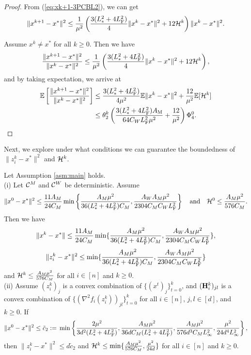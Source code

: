 \documentclass[11pt]{article}
\begin{document}
\begin{proof}
		
		From (\ref{eq:xk+1-3PCBL2}), we can get 
		$$
		\|x^{k+1} - x^*\|^2 \leq \frac{1}{\mu^2} \left(  \frac{3(L_{*}^2+4L_{\rm F}^2)}{4} \|x^k-x^*\|^2 + 12 {\cal H}^k  \right) \|x^k-x^*\|^2. 
		$$
		
		Assume $x^k\neq x^*$ for all $k\geq 0$. Then we have 
		$$
		\frac{\|x^{k+1}-x^*\|^2}{\|x^k-x^*\|^2} \leq \frac{1}{\mu^2} \left(  \frac{3(L_{*}^2+4L_{\rm F}^2)}{4} \|x^k-x^*\|^2 + 12 {\cal H}^k  \right), 
		$$
		and by taking expectation, we arrive at  
		\begin{align*}
			\mathbb{E} \left[   \frac{\|x^{k+1}-x^*\|^2}{\|x^k-x^*\|^2} \right] & \leq \frac{3(L_{*}^2+4L_{\rm F}^2)}{4\mu^2} \mathbb{E}\|x^k-x^*\|^2 + \frac{12}{\mu^2} \mathbb{E}[{\cal H}^k] \\ 
			& \leq \theta_2^k \left(  \frac{3(L_{*}^2+4L_{\rm F}^2)A_{\rm M}}{64C_WL_{\rm F}^2\mu^2} + \frac{12}{\mu^2}  \right) \Phi_4^0. 
		\end{align*}
		
	\end{proof}
	
	
	Next, we explore under what conditions we can guarantee the boundedness of $\|z_i^k-x^*\|^2$ and ${\cal H}^k$. 
	
	\begin{theorem}\label{th:nbor-3PCBL2}
		Let Assumption \ref{asm:main} holds. \\ 
		(i) Let ${\mathcal{C}}^M$ and ${\mathcal{C}}^W$ be deterministic. Assume $$\|x^0 - x^*\|^2 \leq \frac{11A_M}{24C_M}\min\left\{  \frac{A_M \mu^2}{36(L_{*}^2+4L_{\rm F}^2)C_M}, \frac{A_WA_M \mu^2}{2304C_MC_WL_{\rm F}^2}  \right\} \quad\text{and}\quad {\cal H}^0 \leq \frac{A_M \mu^2}{576C_M}.$$ Then we have $$\|x^k-x^*\| \leq \frac{11A_M}{24C_M} \min\{  \frac{A_M \mu^2}{36(L_{*}^2+4L_{\rm F}^2)C_M}, \frac{A_WA_M \mu^2}{2304C_MC_WL_{\rm F}^2}  \},$$ $$\|z_i^k - x^*\|^2 \leq \min\{  \frac{A_M \mu^2}{36(L_{*}^2+4L_{\rm F}^2)C_M}, \frac{A_WA_M \mu^2}{2304C_MC_WL_{\rm F}^2}  \}$$ and ${\cal H}^k \leq  \frac{A_M \mu^2}{576C_M}$ for all $i\in [n]$ and $k\geq 0$. \\ 
		
		(ii) Assume $(z_i^k)_j$ is a convex combination of $\{(x^t)_j\}_{t=0}^k$, and $(\mathbf{H}_i^k)_{jl}$ is a convex combination of $\{  (\nabla^2 f_i(z_i^k))_{jl}  \}_{t=0}^k$ for all $i\in [n]$, $j,l \in [d]$, and $k\geq 0$. If $$\|x^0-x^*\|^2 \leq {\tilde c}_2 \; { := }\; \min\left\{ \frac{2\mu^2}{3d^2 (L_{*}^2+4L_{\rm F}^2)}, \frac{A_M \mu^2}{36dC_M(L_{*}^2+4L_{\rm F}^2)}, \frac{A_M\mu^2}{576d^3C_ML_{\infty}^2}, \frac{\mu^2}{24d^4L_{\infty}^2} \right\},$$ then $\|z_i^k-x^*\|^2 \leq d {\tilde c}_2$ and ${\cal H}^k \leq \min \{  \frac{A_M\mu^2}{576C_M}, \frac{\mu^2}{24d}  \}$ for all $i\in [n]$ and $k\geq 0$. 
		
	\end{theorem}
	
\end{document}
